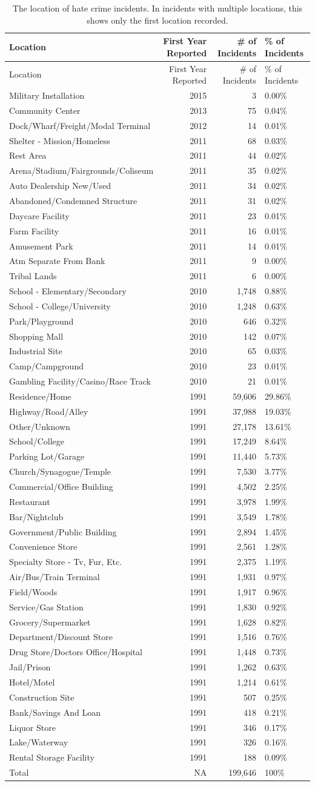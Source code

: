 \documentclass[
  12pt,
  openany]{book}
\begin{document}
\begin{longtable}[]{@{}lrrl@{}}
\caption{\label{tab:hateLocations}The location of hate crime incidents. In incidents with multiple locations, this shows only the first location recorded.}\tabularnewline
\toprule
Location & First Year Reported & \# of Incidents & \% of Incidents\tabularnewline
\midrule
\endfirsthead
\toprule
Location & First Year Reported & \# of Incidents & \% of Incidents\tabularnewline
\midrule
\endhead
Military Installation & 2015 & 3 & 0.00\%\tabularnewline
Community Center & 2013 & 75 & 0.04\%\tabularnewline
Dock/Wharf/Freight/Modal Terminal & 2012 & 14 & 0.01\%\tabularnewline
Shelter - Mission/Homeless & 2011 & 68 & 0.03\%\tabularnewline
Rest Area & 2011 & 44 & 0.02\%\tabularnewline
Arena/Stadium/Fairgrounds/Coliseum & 2011 & 35 & 0.02\%\tabularnewline
Auto Dealership New/Used & 2011 & 34 & 0.02\%\tabularnewline
Abandoned/Condemned Structure & 2011 & 31 & 0.02\%\tabularnewline
Daycare Facility & 2011 & 23 & 0.01\%\tabularnewline
Farm Facility & 2011 & 16 & 0.01\%\tabularnewline
Amusement Park & 2011 & 14 & 0.01\%\tabularnewline
Atm Separate From Bank & 2011 & 9 & 0.00\%\tabularnewline
Tribal Lands & 2011 & 6 & 0.00\%\tabularnewline
School - Elementary/Secondary & 2010 & 1,748 & 0.88\%\tabularnewline
School - College/University & 2010 & 1,248 & 0.63\%\tabularnewline
Park/Playground & 2010 & 646 & 0.32\%\tabularnewline
Shopping Mall & 2010 & 142 & 0.07\%\tabularnewline
Industrial Site & 2010 & 65 & 0.03\%\tabularnewline
Camp/Campground & 2010 & 23 & 0.01\%\tabularnewline
Gambling Facility/Casino/Race Track & 2010 & 21 & 0.01\%\tabularnewline
Residence/Home & 1991 & 59,606 & 29.86\%\tabularnewline
Highway/Road/Alley & 1991 & 37,988 & 19.03\%\tabularnewline
Other/Unknown & 1991 & 27,178 & 13.61\%\tabularnewline
School/College & 1991 & 17,249 & 8.64\%\tabularnewline
Parking Lot/Garage & 1991 & 11,440 & 5.73\%\tabularnewline
Church/Synagogue/Temple & 1991 & 7,530 & 3.77\%\tabularnewline
Commercial/Office Building & 1991 & 4,502 & 2.25\%\tabularnewline
Restaurant & 1991 & 3,978 & 1.99\%\tabularnewline
Bar/Nightclub & 1991 & 3,549 & 1.78\%\tabularnewline
Government/Public Building & 1991 & 2,894 & 1.45\%\tabularnewline
Convenience Store & 1991 & 2,561 & 1.28\%\tabularnewline
Specialty Store - Tv, Fur, Etc. & 1991 & 2,375 & 1.19\%\tabularnewline
Air/Bus/Train Terminal & 1991 & 1,931 & 0.97\%\tabularnewline
Field/Woods & 1991 & 1,917 & 0.96\%\tabularnewline
Service/Gas Station & 1991 & 1,830 & 0.92\%\tabularnewline
Grocery/Supermarket & 1991 & 1,628 & 0.82\%\tabularnewline
Department/Discount Store & 1991 & 1,516 & 0.76\%\tabularnewline
Drug Store/Doctors Office/Hospital & 1991 & 1,448 & 0.73\%\tabularnewline
Jail/Prison & 1991 & 1,262 & 0.63\%\tabularnewline
Hotel/Motel & 1991 & 1,214 & 0.61\%\tabularnewline
Construction Site & 1991 & 507 & 0.25\%\tabularnewline
Bank/Savings And Loan & 1991 & 418 & 0.21\%\tabularnewline
Liquor Store & 1991 & 346 & 0.17\%\tabularnewline
Lake/Waterway & 1991 & 326 & 0.16\%\tabularnewline
Rental Storage Facility & 1991 & 188 & 0.09\%\tabularnewline
Total & NA & 199,646 & 100\%\tabularnewline
\bottomrule
\end{longtable}
\end{document}
